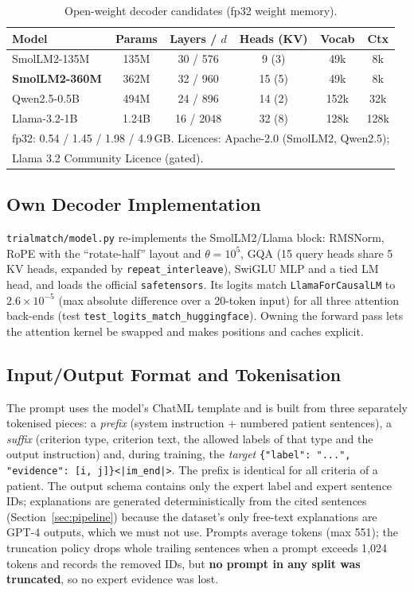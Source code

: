 \documentclass[conference]{IEEEtran}
\begin{document}
\begin{table}[t]\centering\caption{Open-weight decoder candidates (fp32 weight memory).}\label{tab:models}
\setlength{\tabcolsep}{3pt}
\begin{tabular}{lccccc}\toprule
Model & Params & Layers / $d$ & Heads (KV) & Vocab & Ctx\\\midrule
SmolLM2-135M & 135M & 30 / 576 & 9 (3) & 49k & 8k\\
\textbf{SmolLM2-360M} & 362M & 32 / 960 & 15 (5) & 49k & 8k\\
Qwen2.5-0.5B & 494M & 24 / 896 & 14 (2) & 152k & 32k\\
Llama-3.2-1B & 1.24B & 16 / 2048 & 32 (8) & 128k & 128k\\\midrule
\multicolumn{6}{l}{fp32: 0.54 / 1.45 / 1.98 / 4.9\,GB. Licences: Apache-2.0 (SmolLM2, Qwen2.5);}\\
\multicolumn{6}{l}{Llama 3.2 Community Licence (gated).}\\
\bottomrule\end{tabular}\end{table}

\subsection{Own Decoder Implementation}
\texttt{trialmatch/model.py} re-implements the SmolLM2/Llama block: RMSNorm, RoPE with the ``rotate-half'' layout and $\theta{=}10^5$, GQA (15 query heads share 5 KV heads, expanded by \texttt{repeat\_interleave}), SwiGLU MLP and a tied LM head, and loads the official \texttt{safetensors}. Its logits match \texttt{LlamaForCausalLM} to $2.6\times10^{-5}$ (max absolute difference over a 20-token input) for all three attention back-ends (test \texttt{test\_logits\_match\_huggingface}). Owning the forward pass lets the attention kernel be swapped and makes positions and caches explicit.

\subsection{Input/Output Format and Tokenisation}
The prompt uses the model's ChatML template and is built from three separately tokenised pieces: a \emph{prefix} (system instruction + numbered patient sentences), a \emph{suffix} (criterion type, criterion text, the allowed labels of that type and the output instruction) and, during training, the \emph{target} \texttt{\{"label": "...", "evidence": [i, j]\}<|im\_end|>}. The prefix is identical for all criteria of a patient. The output schema contains only the expert label and expert sentence IDs; explanations are generated deterministically from the cited sentences (Section~\ref{sec:pipeline}) because the dataset's only free-text explanations are GPT-4 outputs, which we must not use. Prompts average \promptMean{} tokens (max 551); the truncation policy drops whole trailing sentences when a prompt exceeds 1{,}024 tokens and records the removed IDs, but \textbf{no prompt in any split was truncated}, so no expert evidence was lost.
\end{document}
